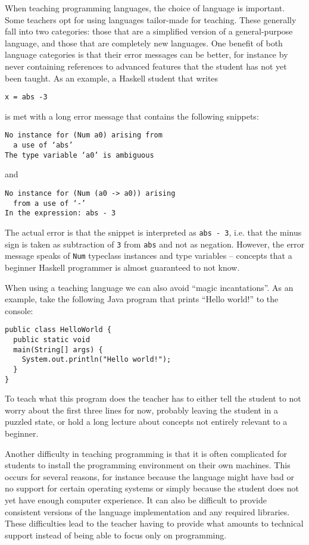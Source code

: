 When teaching programming languages, the choice of language is important.  Some
teachers opt for using languages tailor-made for teaching. These generally fall
into two categories: those that are a simplified version of a general-purpose
language, and those that are completely new languages. One benefit of both
language categories is that their error messages can be better, for instance by
never containing references to advanced features that the student has not yet
been taught. As an example, a Haskell student that writes
\begin{verbatim}
x = abs -3
\end{verbatim}
is met with a long error message that contains the following snippets:
\begin{verbatim}
No instance for (Num a0) arising from
  a use of ‘abs’
The type variable ‘a0’ is ambiguous
\end{verbatim}
and
\begin{verbatim}
No instance for (Num (a0 -> a0)) arising
  from a use of ‘-’
In the expression: abs - 3
\end{verbatim}
The actual error is that the snippet is interpreted as \texttt{abs - 3}, i.e.
that the minus sign is taken as subtraction of \texttt{3} from \texttt{abs} and
not as negation.  However, the error message speaks of \texttt{Num} typeclass
instances and type variables -- concepts that a beginner Haskell programmer is
almost guaranteed to not know.

When using a teaching language we can also avoid ``magic incantations''. As an
example, take the following Java program that prints ``Hello world!'' to the
console:
\begin{verbatim}
public class HelloWorld {
  public static void
  main(String[] args) {
    System.out.println("Hello world!");
  }
}
\end{verbatim}
To teach what this program does the teacher has to either tell the student to
not worry about the first three lines for now, probably leaving the student in
a puzzled state, or hold a long lecture about concepts not entirely relevant to
a beginner.

Another difficulty in teaching programming is that it is often complicated for
students to install the programming environment on their own machines. This
occurs for several reasons, for instance because the language might have bad or
no support for certain operating systems or simply because the student does not
yet have enough computer experience. It can also be difficult to provide
consistent versions of the language implementation and any required libraries.
These difficulties lead to the teacher having to provide what amounts to
technical support instead of being able to focus only on programming.
